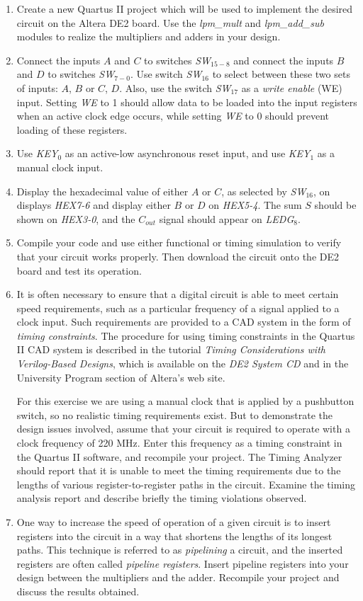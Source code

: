 \documentclass[psfig,10pt,fullpage]{article}
\begin{document}
\begin{enumerate}
\item Create a new Quartus II project which will be used to implement the desired
circuit on the Altera DE2 board. Use the {\it lpm\_mult} and {\it lpm\_add\_sub} modules
to realize the multipliers and adders in your design.
\item Connect the inputs $A$ and $C$ to switches {\it SW}$_{15-8}$ and 
connect the inputs $B$ and $D$ to switches {\it SW}$_{7-0}$. Use switch 
{\it SW}$_{16}$ to select between these two sets of inputs: $A$, $B$ or $C$, $D$. Also, use
the switch {\it SW}$_{17}$ as a {\it write enable} (WE) input. Setting {\it WE} to 1 should 
allow data to be loaded into the input registers when an active clock edge occurs, while 
setting {\it WE} to 0 should prevent loading of these registers.
\item Use {\it KEY}$_0$ as an active-low asynchronous reset
input, and use {\it KEY}$_1$ as a manual clock input. 
\item
Display the hexadecimal value of either $A$ or $C$, as selected by {\it SW}$_{16}$, 
on displays {\it HEX7-6} and display either $B$ or $D$ on {\it HEX5-4}. The sum $S$ should
be shown on {\it HEX3-0}, and the $C_{out}$ signal should appear on {\it LEDG}$_8$. 
\item Compile your code and use either functional or timing simulation to verify that 
your circuit works properly. Then download the circuit onto the DE2 board and test its
operation.
\item It is often necessary to ensure that a digital circuit is able to meet certain
speed requirements, such as a particular frequency of a signal applied to a clock input.
Such requirements
are provided to a CAD system in the form of {\it timing constraints}. The procedure for
using timing constraints in the Quartus II CAD system is described in the tutorial
{\it Timing Considerations with Verilog-Based Designs}, which is available 
on the {\it DE2 System CD} and in the University Program section of Altera's web site.  

For this exercise we are using a manual clock that is applied by a pushbutton switch,
so no realistic timing requirements exist. But to demonstrate the design issues
involved, assume that your circuit is required to operate with a clock frequency of 220
MHz. Enter this frequency as a timing constraint in the Quartus II software, and recompile
your project. The Timing Analyzer should report that it is unable to meet the timing
requirements due to the lengths of various register-to-register paths in the circuit. 
Examine the timing
analysis report and describe briefly the timing violations observed.
\item
One way to increase the speed of operation of a given circuit is to insert registers into the
circuit in a way that shortens the lengths of its longest paths. This technique is 
referred to as {\it pipelining} a circuit, and the inserted registers are often called
{\it pipeline registers}. Insert pipeline registers into your design between the
multipliers and the adder. Recompile your project and discuss the results obtained.
\end{enumerate}
\end{document}
